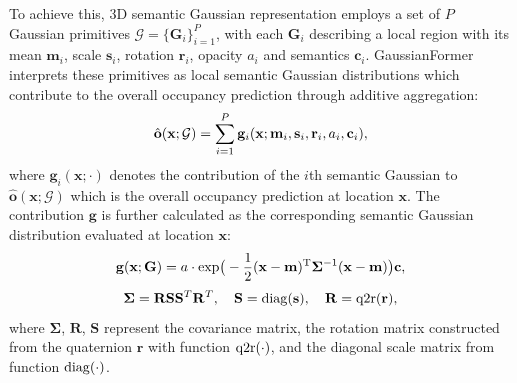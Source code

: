 To achieve this, 3D semantic Gaussian representation employs a set of $P$ Gaussian primitives $\mathcal{G}=\{\mathbf{G}_i\}_{i=1}^{P}$, with each $\mathbf{G}_i$ describing a local region with its mean $\mathbf{m}_i$, scale $\mathbf{s}_i$, rotation $\mathbf{r}_i$, opacity $a_i$ and semantics $\mathbf{c}_i$.
GaussianFormer interprets these primitives as local semantic Gaussian distributions which contribute to the overall occupancy prediction through additive aggregation:
\vspace{-2mm}
\begin{equation}
    \hat{\mathbf{o}}(\mathbf{x}; \mathcal{G})=\sum_{i=1}^{P}\mathbf{g}_i(\mathbf{x}; \mathbf{m}_i,\mathbf{s}_i,\mathbf{r}_i,a_i,\mathbf{c}_i),
    \label{eq: weighted summation}
    \vspace{-2mm}
\end{equation}
where $\mathbf{g}_i(\mathbf{x};\cdot)$ denotes the contribution of the $i$th semantic Gaussian to $\hat{\mathbf{o}}(\mathbf{x}; \mathcal{G})$ which is the overall occupancy prediction at location $\mathbf{x}$.
The contribution $\mathbf{g}$ is further calculated as the corresponding semantic Gaussian distribution evaluated at location $\mathbf{x}$:
\begin{equation}
    \mathbf{g}(\mathbf{x}; \mathbf{G}) = a\cdot{\rm{exp}}\big(-\frac{1}{2}(\mathbf{x}-\mathbf{m})^{\rm T} \mathbf{\Sigma}^{-1} (\mathbf{x}-\mathbf{m})\big)\mathbf{c},
    \label{eq: gaussian dist}
\end{equation}
\begin{equation}
    \mathbf{\Sigma} = \mathbf{R}\mathbf{S}\mathbf{S}^T\mathbf{R}^T, \quad \mathbf{S} = {\rm{diag}}(\mathbf{s}), \quad \mathbf{R} = {\rm{q2r}}(\mathbf{r}),
\end{equation}
where $\mathbf{\Sigma}$, $\mathbf{R}$, $\mathbf{S}$ represent the covariance matrix, the rotation matrix constructed from the quaternion $\mathbf{r}$ with function ${\rm q2r}(\cdot)$, and the diagonal scale matrix from function ${\rm diag}(\cdot)$.

